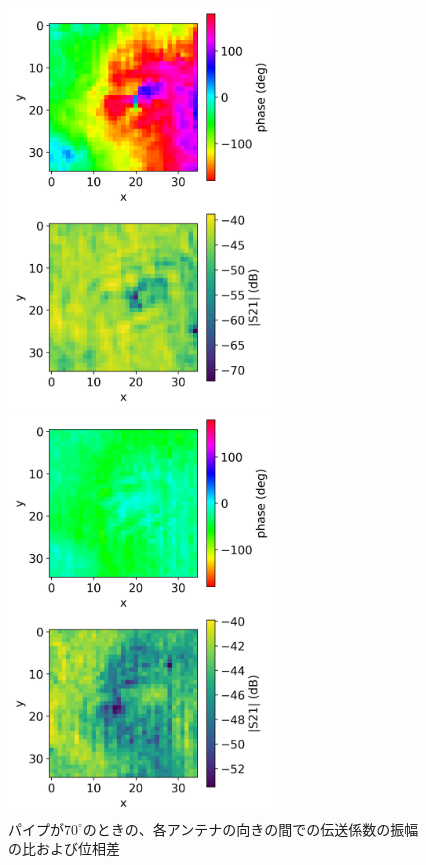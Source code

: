 \documentclass[11pt,a4paper,uplatex]{ujarticle}
\begin{document}
\begin{figure}[tbp]
    \begin{minipage}[b]{0.495\textwidth}
      \centering
      \includegraphics[keepaspectratio, width=70mm]{Images/python/rowdata/130.png}
    \end{minipage}
    \begin{minipage}[b]{0.495\textwidth}
      \centering
      \includegraphics[keepaspectratio, width=70mm]{Images/python/rowdata/180.png}
    \end{minipage}
    \caption{パイプが$70^{\circ}$のときの、各アンテナの向きの間での伝送係数の振幅の比および位相差}
  \end{figure}
  
\end{document}
